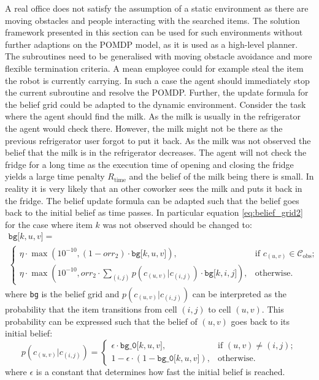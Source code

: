 A real office does not satisfy the assumption of a static environment as there are moving obstacles and people interacting with the searched items. 
The solution framework presented in this section can be used for such environments without further adaptions on the POMDP model, as it is used as a high-level planner. The subroutines need to be generalised with moving obstacle avoidance and more flexible termination criteria. A mean employee could for example steal the item the robot is currently carrying. In such a case the agent should immediately stop the current subroutine and resolve the POMDP. Further, the update formula for the belief grid could be adapted to the dynamic environment. Consider the task where the agent should find the milk. As the milk is usually in the refrigerator the agent would check there. However, the milk might not be there as the previous refrigerator user forgot to put it back. As the milk was not observed the belief that the milk is in the refrigerator decreases. The agent will not check the fridge for a long time as the execution time of opening and closing the fridge yields a large time penalty $R_\text{time}$ and the belief of the milk being there is small. In reality it is very likely that an other coworker sees the milk and puts it back in the fridge. The belief update formula can be adapted such that the belief goes back to the initial belief as time passes. In particular equation \ref{eq:belief_grid2} for the case where item $k$ was not observed should be changed to:
\begin{multline}
    \texttt{bg[$k, u, v$]} = \\
    \begin{cases} 
        \eta \cdot\max\left(10^{-10}, (1 -  orr_2) \cdot \texttt{bg[$k, u, v$]}\right), &\text{if }c_{(u,v)} \in \mathcal{C}_\text{obs};\\
        \eta \cdot \max\left(10^{-10}, orr_2 \cdot \sum_{(i,j)}p(c_{(u,v)}|c_{(i,j)}) \cdot \texttt{bg[$k, i, j$]}\right), &\text{otherwise}.
    \end{cases}
\end{multline}
where \texttt{bg} is the belief grid and $p(c_{(u,v)}|c_{(i,j)})$ can be interpreted as the probability that the item transitions from cell $(i,j)$ to cell $(u,v)$. This probability can be expressed such that the belief of $(u,v)$ goes back to its initial belief: 
\begin{equation}
    p(c_{(u,v)}|c_{(i,j)}) = \begin{cases}
    \epsilon \cdot \texttt{bg\_0[$k, u, v$]}, &\text{if } (u,v)\neq (i,j);\\
    1 - \epsilon \cdot (1-\texttt{bg\_0[$k, u, v$]}), &\text{otherwise}.
    \end{cases}
\end{equation}
where $\epsilon$ is a constant that determines how fast the initial belief is reached.\\

